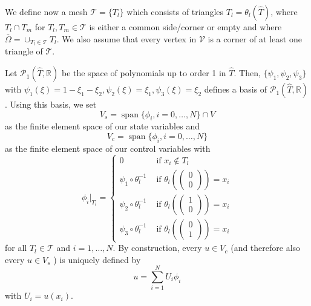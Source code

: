 We define now a mesh $\mathcal{T}=\{T_l\}$ which consists of triangles $T_l=\theta_l(\hat{T})$, where $T_l\cap T_m$ for $T_l,T_m\in\mathcal{T}$ is either a common side/corner or empty and where $\bar{\Omega}=\cup_{T_l\in\mathcal{T}}T_l$. We also assume that every vertex in $\mathcal{V}$ is a corner of at least one triangle of $\mathcal{T}$.

Let $\mathcal{P}_1(\hat{T}, \mathbb{R})$ be the space of polynomials up to order 1 in $\hat{T}$. Then, $\{\psi_1, \psi_2, \psi_3\}$ with $\psi_1(\xi)=1-\xi_1-\xi_2, \psi_2(\xi)=\xi_1, \psi_3(\xi)=\xi_2$ defines a basis of $\mathcal{P}_1(\hat{T}, \mathbb{R})$.
Using this basis, we set
\begin{displaymath}
V_s=\operatorname*{span}\{\phi_i, i=0,\dotsc,N\}\cap V
\end{displaymath}
as the finite element space of our state variables and
\begin{displaymath}
V_c=\operatorname*{span}\{\phi_i, i=0,\dotsc,N\}
\end{displaymath}
as the finite element space of our control variables with
\begin{displaymath}
\phi_i|_{T_l}=\begin{cases}
0 & \text{ if $x_i\notin T_l$}\\
\psi_1 \circ \theta_l^{-1} & \text{ if $\theta_l\left(\begin{pmatrix} 0 \\ 0 \end{pmatrix}\right)=x_i$}\\
\psi_2 \circ \theta_l^{-1} & \text{ if $\theta_l\left(\begin{pmatrix} 1 \\ 0 \end{pmatrix}\right)=x_i$}\\
\psi_3 \circ \theta_l^{-1} & \text{ if $\theta_l\left(\begin{pmatrix} 0 \\ 1 \end{pmatrix}\right)=x_i$}
\end{cases} 
\end{displaymath}
for all $T_l\in\mathcal{T}$ and $i=1,\dotsc,N$. By construction, every $u\in V_c$ (and therefore also every $u\in V_s$ ) is uniquely defined by
\begin{displaymath}
u=\sum_{i=1}^NU_i\phi_i
\end{displaymath}
with $U_i=u(x_i)$.\\

